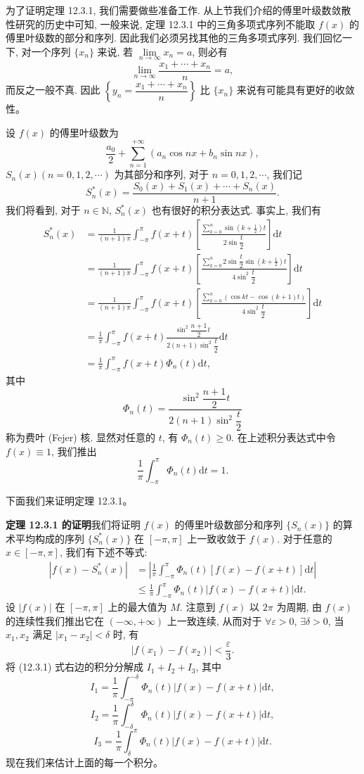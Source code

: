 \documentclass[UTF8,12pt,a4paper,fontset=fandol]{ctexart}
\begin{document}
为了证明定理 12.3.1, 我们需要做些准备工作. 从上节我们介绍的傅里叶级数敛散性研究的历史中可知, 一般来说, 定理 12.3.1 中的三角多项式序列不能取 $f(x)$ 的傅里叶级数的部分和序列. 因此我们必须另找其他的三角多项式序列. 我们回忆一下, 对一个序列 $\{x_n\}$ 来说, 若 $\lim\limits_{n\to\infty}x_n=a$, 则必有
\[
  \lim_{n\to\infty}\frac{x_1+\cdots+x_n}{n}=a,
\]
而反之一般不真. 因此 $\left\{y_n=\dfrac{x_1+\cdots+x_n}{n}\right\}$ 比 $\{x_n\}$ 来说有可能具有更好的收敛性。

设 $f(x)$ 的傅里叶级数为
\[
  \frac{a_0}{2}+\sum_{n=1}^{+\infty}(a_n\cos nx+b_n\sin nx),
\]
$S_n(x)(n=0,1,2,\cdots)$ 为其部分和序列, 对于 $n=0,1,2,\cdots$, 我们记
\[
  S_n^*(x)=\frac{S_0(x)+S_1(x)+\cdots+S_n(x)}{n+1}.
\]
我们将看到, 对于 $n\in\mathbb N$, $S_n^*(x)$ 也有很好的积分表达式. 事实上, 我们有
\[
\begin{aligned}
  S_n^*(x)
  &=\frac{1}{(n+1)\pi}\int_{-\pi}^{\pi}f(x+t)
    \left[
      \frac{\displaystyle\sum_{k=0}^n\sin\left(k+\frac12\right)t}{2\sin\dfrac t2}
    \right]\mathrm dt\\
  &=\frac{1}{(n+1)\pi}\int_{-\pi}^{\pi}f(x+t)
    \left[
      \frac{\displaystyle\sum_{k=0}^n2\sin\dfrac t2\sin\left(k+\frac12\right)t}{4\sin^2\dfrac t2}
    \right]\mathrm dt\\
  &=\frac{1}{(n+1)\pi}\int_{-\pi}^{\pi}f(x+t)
    \left[
      \frac{\displaystyle\sum_{k=0}^n(\cos kt-\cos(k+1)t)}{4\sin^2\dfrac t2}
    \right]\mathrm dt\\
  &=\frac1\pi\int_{-\pi}^{\pi}f(x+t)
    \frac{\sin^2\dfrac{n+1}{2}t}{2(n+1)\sin^2\dfrac t2}\mathrm dt\\
  &=\frac1\pi\int_{-\pi}^{\pi}f(x+t)\Phi_n(t)\mathrm dt,
\end{aligned}
\]
其中
\[
  \Phi_n(t)=\frac{\sin^2\dfrac{n+1}{2}t}{2(n+1)\sin^2\dfrac t2}
\]
称为费叶 (Fejer) 核. 显然对任意的 $t$, 有 $\Phi_n(t)\geqslant0$. 在上述积分表达式中令 $f(x)\equiv1$, 我们推出
\[
  \frac1\pi\int_{-\pi}^{\pi}\Phi_n(t)\mathrm dt=1.
\]

下面我们来证明定理 12.3.1。

\noindent\textbf{定理 12.3.1 的证明}\quad 我们将证明 $f(x)$ 的傅里叶级数部分和序列 $\{S_n(x)\}$ 的算术平均构成的序列 $\{S_n^*(x)\}$ 在 $[-\pi,\pi]$ 上一致收敛于 $f(x)$. 对于任意的 $x\in[-\pi,\pi]$, 我们有下述不等式:
\begin{equation}
\begin{aligned}
  |f(x)-S_n^*(x)|
  &=\left|\frac1\pi\int_{-\pi}^{\pi}\Phi_n(t)[f(x)-f(x+t)]\mathrm dt\right|\\
  &\leqslant\frac1\pi\int_{-\pi}^{\pi}\Phi_n(t)|f(x)-f(x+t)|\mathrm dt.
\end{aligned}
\tag{12.3.1}
\end{equation}
设 $|f(x)|$ 在 $[-\pi,\pi]$ 上的最大值为 $M$. 注意到 $f(x)$ 以 $2\pi$ 为周期, 由 $f(x)$ 的连续性我们推出它在 $(-\infty,+\infty)$ 上一致连续, 从而对于 $\forall\varepsilon>0$, $\exists\delta>0$, 当 $x_1,x_2$ 满足 $|x_1-x_2|<\delta$ 时, 有
\[
  |f(x_1)-f(x_2)|<\frac{\varepsilon}{3}.
\]
将 (12.3.1) 式右边的积分分解成 $I_1+I_2+I_3$, 其中
\[
  I_1=\frac1\pi\int_{-\pi}^{-\delta}\Phi_n(t)|f(x)-f(x+t)|\mathrm dt,
\]
\[
  I_2=\frac1\pi\int_{-\delta}^{\delta}\Phi_n(t)|f(x)-f(x+t)|\mathrm dt,
\]
\[
  I_3=\frac1\pi\int_{\delta}^{\pi}\Phi_n(t)|f(x)-f(x+t)|\mathrm dt.
\]
现在我们来估计上面的每一个积分。
\end{document}
